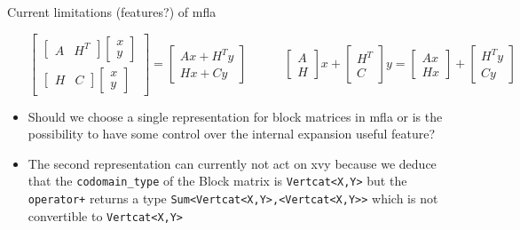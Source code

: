 \documentclass[9pt]{beamer}
\begin{document}
\begin{frame}[fragile]{Current limitations (features?) of mfla}
\begin{itemize}
  $$\begin{bmatrix} \begin{bmatrix} A  & H^T \end{bmatrix} \begin{bmatrix} x \\ y \end{bmatrix}  \\ \begin{bmatrix}  H  & C \end{bmatrix} \begin{bmatrix} x \\ y \end{bmatrix} \end{bmatrix}=
  \begin{bmatrix}  Ax  + H^Ty  \\  Hx  + Cy  \end{bmatrix}
  \quad\quad\quad
  \begin{bmatrix} A  \\ H \end{bmatrix}x  +  \begin{bmatrix}  H^T  \\ C \end{bmatrix}y =  \begin{bmatrix} Ax \\ Hx \end{bmatrix}  +  \begin{bmatrix}  H^Ty   \\ Cy \end{bmatrix}
  $$
\pause

\item Should we choose a single representation for block matrices in mfla or is the possibility to have some control over the internal expansion useful feature?
\pause
\item The second representation can currently not act on xvy because we deduce that the \lstinline|codomain_type| of the Block matrix is \lstinline|Vertcat<X,Y>| but the \lstinline|operator+| returns a type   \lstinline|Sum<Vertcat<X,Y>,<Vertcat<X,Y>>| which is not convertible to \lstinline|Vertcat<X,Y>|
  \end{itemize}
\end{frame}
\end{document}
